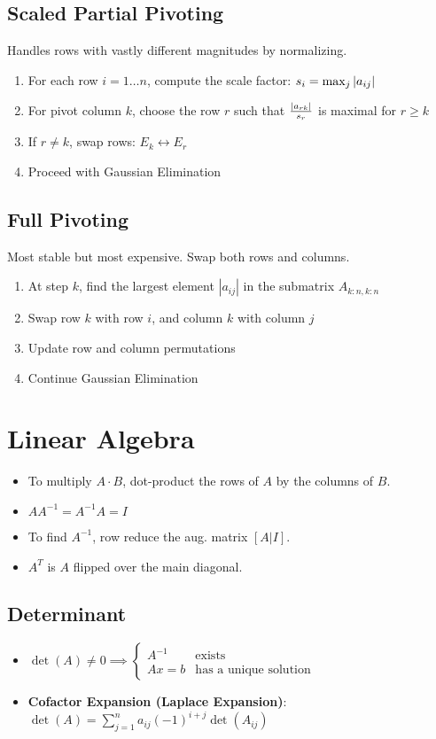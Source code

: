 \documentclass[8pt, letterpaper]{extarticle}
\begin{document}
\begin{multicols*}{3}
  \subsection{Scaled Partial Pivoting}
  Handles rows with vastly different magnitudes by normalizing.
  \begin{enumerate}
    \item For each row $i = 1 \dots n$, compute the scale factor: $s_i = \max_j \abs{a_{ij}}$
    \item For pivot column $k$, choose the row $r$ such that $\frac{\abs{a_{rk}}}{s_r}$ is maximal for $r \geq k$
    \item If $r \neq k$, swap rows: $E_k \leftrightarrow E_r$
    \item Proceed with Gaussian Elimination
  \end{enumerate}

  \subsection{Full Pivoting}
  Most stable but most expensive. Swap both rows and columns.
  \begin{enumerate}
    \item At step $k$, find the largest element $|a_{ij}|$ in the submatrix $A_{k:n,k:n}$
    \item Swap row $k$ with row $i$, and column $k$ with column $j$
    \item Update row and column permutations
    \item Continue Gaussian Elimination
  \end{enumerate}

  \section{Linear Algebra}
  \begin{itemize}
    \item To multiply $A \cdot B$, dot-product the rows of $A$ by the columns of $B$.
    \item $A A^{-1} = A^{-1} A = I$
    \item To find $A^{-1}$, row reduce the aug. matrix $[A | I]$.
    \item $A^T$ is $A$ flipped over the main diagonal.
  \end{itemize}

  \subsection{Determinant}
  \begin{itemize}
    \item $\det(A) \neq 0 \implies \begin{cases}
        A^{-1} & \text{exists} \\
        Ax = b & \text{has a unique solution}
      \end{cases}$
    \item \textbf{Cofactor Expansion (Laplace Expansion)}:  
      $\det(A) = \sum_{j=1}^{n} a_{ij} (-1)^{i+j} \det(A_{ij})$


\end{itemize}
\end{multicols*}
\end{document}
